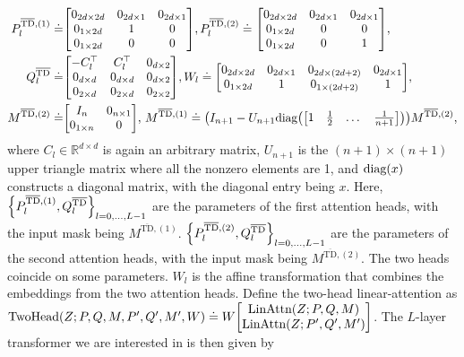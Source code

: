 \documentclass{article}
\newcommand{\R}{\mathbb{R}}
\newcommand{\attn}{\text{LinAttn}}
\newcommand{\twohead}{\text{TwoHead}}
\newcommand{\bartd}{\overline{\text{TD}}}
\begin{document}
\begin{align}
    P_l^{\bartd, (1)}\doteq & \mqty[0_{2d \times 2d} & 0_{2d \times 1} & 0_{2d \times 1}\\
                       0_{1 \times 2d} & 1 & 0\\
                       0_{1\times 2d} & 0 & 0], 
    P_l^{\bartd, (2)} \doteq \mqty[0_{2d \times 2d} & 0_{2d \times 1} & 0_{2d \times 1}\\
                       0_{1 \times 2d} & 0 & 0\\
                       0_{1\times 2d} & 0 & 1] \label{eq: two-head P matrices},\\
    Q^{\bartd}_l \doteq & \mqty[-C_l^\top & C_l^\top & 0_{d \times 2} \\
                       0_{d \times d} & 0_{d \times d} & 0_{d \times 2}\\
                       0_{2 \times d} & 0_{2 \times d} & 0_{2\times2}],
    W_l \doteq \mqty[0_{2d \times 2d} & 0_{2d \times 1} & 0_{2d \times (2d + 2)} & 0_{2d \times 1} \\
                     0_{1 \times 2d} & 1 & 0_{1 \times (2d+2)} & 1]\label{eq: two-head Q and W}, \\
    M^{\bartd, (2)} \doteq & \mqty[I_n & 0_{n \times 1}\\
                     0_{1 \times n} & 0], \,
    M^{\bartd, (1)} \doteq  \qty(I_{n+1} - U_{n+1} \text{diag}\qty(\mqty[1& \frac{1}{2}& \dots& \frac{1}{n+1}]))M^{\bartd, (2)}, \label{eq: two-head mask}
\end{align}
where $C_l \in \R^{d\times d}$ is again an arbitrary matrix,
$U_{n+1}$ is the $(n+1) \times (n+1)$ upper triangle matrix where all the nonzero elements are 1,
and $\text{diag}\qty(x)$ constructs a diagonal matrix, with the diagonal entry being $x$.
Here, $\qty{P_l^{\bartd, (1)}, Q_l^{\bartd}}_{l=0,\dots,L-1}$ are the parameters of the first attention heads, 
with the input mask being $M^{\bartd, (1)}$.
$\qty{P_l^{\bartd, (2)}, Q_l^{\bartd}}_{l=0,\dots,L-1}$ are the parameters of the second attention heads,
with the input mask being $M^{\bartd, (2)}$.
The two heads coincide on some parameters. 
$W_l$ is the affine transformation that combines the embeddings from the two attention heads.
Define the two-head linear-attention as
    $\twohead(Z; P, Q, M, P', Q', M', W) \doteq W \mqty[\attn(Z; P, Q, M) \\ \attn(Z; P', Q', M')]$.
The $L$-layer transformer we are interested in is then given by 
\end{document}
